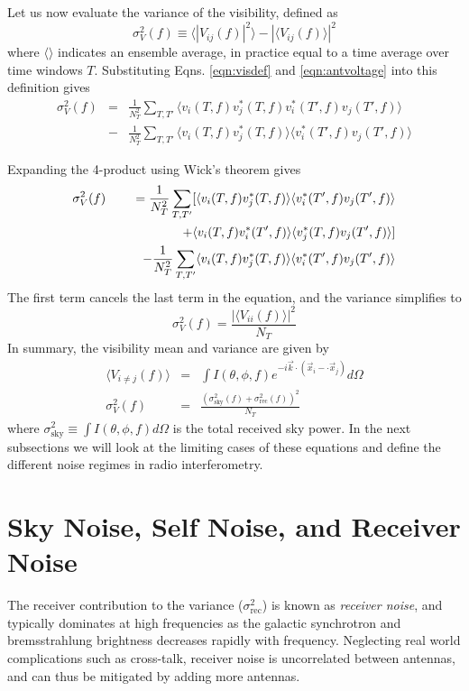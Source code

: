 Let us now evaluate the variance of the visibility, defined as
\begin{equation}
\sigma_V^2(f)\equiv\langle |V_{ij}(f)|^2\rangle-|\langle V_{ij}(f)\rangle|^2
\end{equation}
where $\langle\rangle$ indicates an ensemble average, in practice equal to a time average over time windows $T$.
Substituting Eqns. \ref{eqn:visdef} and \ref{eqn:antvoltage} into this definition gives
\begin{eqnarray}
\sigma_V^2(f) &=&\frac{1}{N_T^2}\sum_{T,T'}\langle v_i(T,f)v_j^*(T,f)v_i^*(T',f)v_j(T',f)\rangle \nonumber \\
&-&\frac{1}{N_T^2}\sum_{T,T'}\langle v_i(T,f)v_j^*(T,f)\rangle \langle v_i^*(T',f)v_j(T',f)\rangle
\end{eqnarray}

Expanding the 4-product using Wick's theorem gives
\begin{eqnarray}
\sigma_V^2(f)&&=\frac{1}{N_T^2}\sum_{T,T'}[\langle v_i(T,f)v_j^*(T,f)\rangle\langle v_i^*(T',f)v_j(T',f)\rangle \nonumber \\
&&\hspace{18mm}+\langle v_i(T,f)v_i^*(T',f)\rangle\langle v_j^*(T,f)v_j(T',f)\rangle]\nonumber \\
&&-\frac{1}{N_T^2}\sum_{T,T'}\langle v_i(T,f)v_j^*(T,f)\rangle \langle v_i^*(T',f)v_j(T',f)\rangle
\end{eqnarray}
The first term cancels the last term in the equation, and the variance simplifies to
\begin{equation}
\label{eqn:varauto}
\sigma_V^2(f)=\frac{|\langle V_{ii}(f)\rangle|^2}{N_T}
\end{equation}
In summary, the visibility mean and variance are given by
\begin{eqnarray}
\langle V_{i\ne j}(f)\rangle &=&\int I(\theta,\phi,f)e^{-i\vec{k}\cdot(\vec{x}_i-\cdot\vec{x}_j)}d\Omega \label{eqn:vismean}\\
\sigma_V^2(f)&=&\frac{(\sigma^2_\text{sky}(f)+\sigma^2_\text{rec}(f))^2}{N_T} \label{eqn:visvar}
\end{eqnarray}
where $\sigma^2_\text{sky}\equiv\int I(\theta,\phi,f)d\Omega$ is the total received sky power. In the next subsections we will look at the limiting cases of these equations and define the different noise regimes in radio interferometry.

\section{Sky Noise, Self Noise, and Receiver Noise}
\label{sec:skyselfreceivernoise}
The receiver contribution to the variance ($\sigma_\text{rec}^2$) is known as \textit{receiver noise}, and typically dominates at high frequencies as the galactic synchrotron and bremsstrahlung brightness decreases rapidly with frequency. Neglecting real world complications such as cross-talk, receiver noise is uncorrelated between antennas, and can thus be mitigated by adding more antennas.

